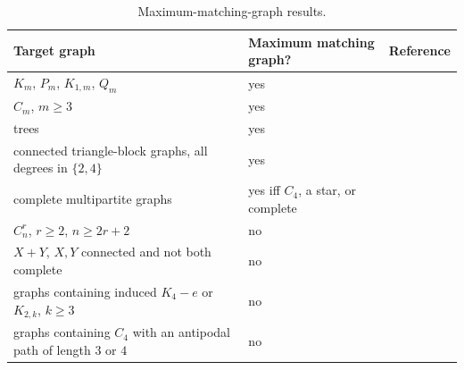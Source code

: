 \documentclass[a4paper]{article}
\theoremstyle{plain}
\theoremstyle{definition}
\numberwithin{equation}{section}
\begin{document}
\begin{table}[htbp]
\centering
\begin{tabularx}{\textwidth}{@{}L{0.42\textwidth}YL{0.14\textwidth}@{}}
\toprule
Target graph & Maximum matching graph? & Reference \\
\midrule
$K_m$, $P_m$, $K_{1,m}$, $Q_m$ & yes & \cite{JonesRoehmSchultz1998} \\
\cmidrule(lr){1-3}
$C_m$, $m\ge 3$ & yes & \cite{JonesRoehmSchultz1998,ErohSchultz1998} \\
\cmidrule(lr){1-3}
trees & yes & \cite{Liu2005MaxMatchingTypes} \\
\cmidrule(lr){1-3}
connected triangle-block graphs, all degrees in $\{2,4\}$ & yes & \cite{WangYuanLiuLin1998} \\
\cmidrule(lr){1-3}
complete multipartite graphs & yes iff $C_4$, a star, or complete & \cite{ErohSchultz1998} \\
\cmidrule(lr){1-3}
$C_n^r$, $r\ge 2$, $n\ge 2r+2$ & no & \cite{ErohSchultz1998} \\
\cmidrule(lr){1-3}
$X+Y$, $X,Y$ connected and not both complete & no & \cite{ErohSchultz1998} \\
\cmidrule(lr){1-3}
graphs containing induced $K_4-e$ or $K_{2,k}$, $k\ge 3$ & no & \cite{JonesRoehmSchultz1998,Liu2004Subgraphs} \\
\cmidrule(lr){1-3}
graphs containing $C_4$ with an antipodal path of length $3$ or $4$ & no & \cite{ErohSchultz1998} \\
\bottomrule
\end{tabularx}
\caption{Maximum-matching-graph results.}
\label{tab:matching-graph-targets}
\end{table}
\end{document}

